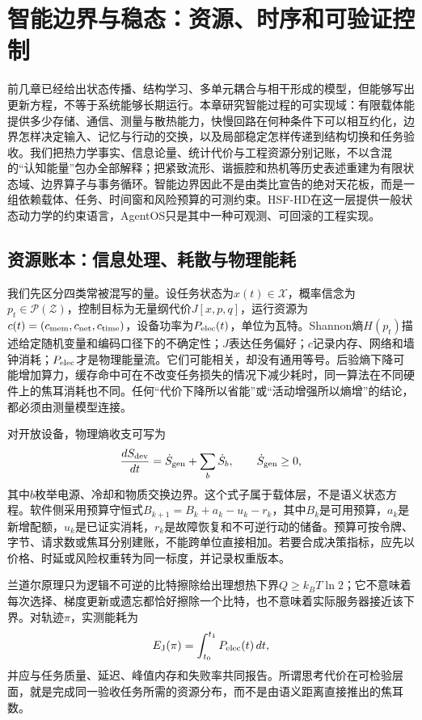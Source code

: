\chapter{智能边界与稳态：资源、时序和可验证控制}
\label{chp:control_meta_physics}

前几章已经给出状态传播、结构学习、多单元耦合与相干形成的模型，但能够写出更新方程，不等于系统能够长期运行。本章研究智能过程的可实现域：有限载体能提供多少存储、通信、测量与散热能力，快慢回路在何种条件下可以相互约化，边界怎样决定输入、记忆与行动的交换，以及局部稳定怎样传递到结构切换和任务验收。我们把热力学事实、信息论量、统计代价与工程资源分别记账，不以含混的“认知能量”包办全部解释；把紧致流形、谐振腔和热机等历史表述重建为有限状态域、边界算子与事务循环。智能边界因此不是由类比宣告的绝对天花板，而是一组依赖载体、任务、时间窗和风险预算的可测约束。HSF-HD在这一层提供一般状态动力学的约束语言，AgentOS只是其中一种可观测、可回滚的工程实现。

\section{资源账本：信息处理、耗散与物理能耗}
\label{sec:section_1447}

我们先区分四类常被混写的量。设任务状态为$x(t)\in\mathcal X$，概率信念为$p_t\in\mathcal P(\mathcal Z)$，控制目标为无量纲代价$J[x,p,q]$，运行资源为$c(t)=(c_{\rm mem},c_{\rm net},c_{\rm time})$，设备功率为$P_{\rm elec}(t)$，单位为瓦特。Shannon熵$H(p_t)$描述给定随机变量和编码口径下的不确定性；$J$表达任务偏好；$c$记录内存、网络和墙钟消耗；$P_{\rm elec}$才是物理能量流。它们可能相关，却没有通用等号。后验熵下降可能增加算力，缓存命中可在不改变任务损失的情况下减少耗时，同一算法在不同硬件上的焦耳消耗也不同。任何“代价下降所以省能”或“活动增强所以熵增”的结论，都必须由测量模型连接。

对开放设备，物理熵收支可写为
\begin{equation}
\frac{dS_{\rm dev}}{dt}=\dot S_{\rm gen}+\sum_b\dot S_b,\qquad \dot S_{\rm gen}\ge0,
\end{equation}
其中$b$枚举电源、冷却和物质交换边界。这个式子属于载体层，不是语义状态方程。软件侧采用预算守恒式$B_{k+1}=B_k+a_k-u_k-r_k$，其中$B_k$是可用预算，$a_k$是新增配额，$u_k$是已证实消耗，$r_k$是故障恢复和不可逆行动的储备。预算可按令牌、字节、请求数或焦耳分别建账，不能跨单位直接相加。若要合成决策指标，应先以价格、时延或风险权重转为同一标度，并记录权重版本。

兰道尔原理只为逻辑不可逆的比特擦除给出理想热下界$Q\ge k_BT\ln2$；它不意味着每次选择、梯度更新或遗忘都恰好擦除一个比特，也不意味着实际服务器接近该下界。对轨迹$\pi$，实测能耗为
\begin{equation}
E_{\rm J}(\pi)=\int_{t_0}^{t_1}P_{\rm elec}(t)\,dt,
\end{equation}
并应与任务质量、延迟、峰值内存和失败率共同报告。所谓思考代价在可检验层面，就是完成同一验收任务所需的资源分布，而不是由语义距离直接推出的焦耳数。


